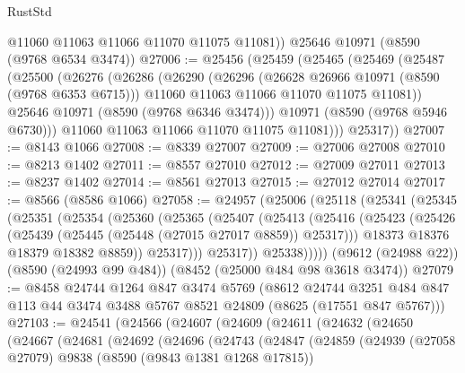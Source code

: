 \begin{lexlean}{RustStd}
\begin{coremodule}
        @11060
        @11063
        @11066
        @11070
        @11075
        @11081))
    @25646
    @10971
    (@8590 (@9768 @6534 @3474))
@27006 := @25456
    (@25459
      (@25465
        (@25469
          (@25487
            (@25500
              (@26276
                (@26286
                  (@26290
                    (@26296
                      (@26628 @26966 @10971 (@8590 (@9768 @6353 @6715)))
                      @11060
                      @11063
                      @11066
                      @11070
                      @11075
                      @11081))
                  @25646
                  @10971
                  (@8590 (@9768 @6346 @3474)))
                @10971
                (@8590 (@9768 @5946 @6730)))
              @11060
              @11063
              @11066
              @11070
              @11075
              @11081)))
        @25317))
@27007 := @8143 @1066
@27008 := @8339 @27007
@27009 := @27006 @27008
@27010 := @8213 @1402
@27011 := @8557 @27010
@27012 := @27009 @27011
@27013 := @8237 @1402
@27014 := @8561 @27013
@27015 := @27012 @27014
@27017 := @8566 (@8586 @1066)
@27058 := @24957
    (@25006
      (@25118
        (@25341
          (@25345
            (@25351
              (@25354
                (@25360
                  (@25365
                    (@25407
                      (@25413
                        (@25416
                          (@25423
                            (@25426 (@25439 (@25445 (@25448 (@27015 @27017 @8859)) @25317)))
                            @18373
                            @18376
                            @18379
                            @18382
                            @8859))
                        @25317)))
                  @25317))
              @25338)))))
    (@9612 (@24988 @22))
    (@8590 (@24993 @99 @484))
    (@8452 (@25000 @484 @98 @3618 @3474))
@27079 := @8458
    @24744
    @1264
    @847
    @3474
    @5769
    (@8612
      @24744
      @3251
      @484
      @847
      @113
      @44
      @3474
      @3488
      @5767
      @8521
      @24809
      (@8625 (@17551 @847 @5767)))
@27103 := @24541
    (@24566
      (@24607
        (@24609
          (@24611
            (@24632
              (@24650
                (@24667
                  (@24681
                    (@24692
                      (@24696
                        (@24743
                          (@24847
                            (@24859
                              (@24939
                                (@27058 @27079)
                                @9838
                                (@8590 (@9843 @1381 @1268 @17815))

\end{coremodule}
\end{lexlean}
